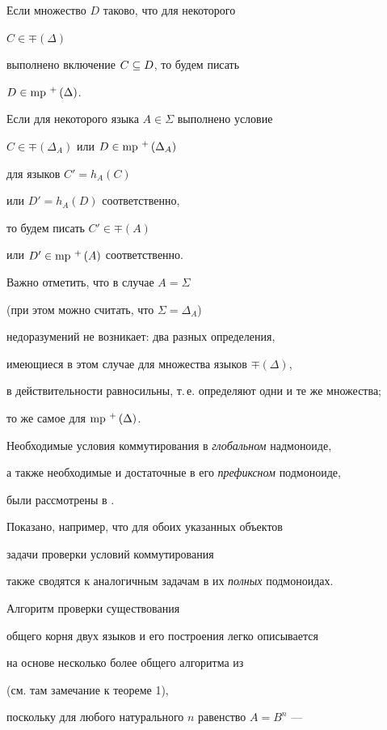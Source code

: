 \setcounter{footnote}{0}





 Если множество $D$ таково, что для некоторого


$C\in\mp(\Delta) $


 выполнено включение $C\subseteq D$, то будем писать


$D\in\operatorname{mp}\,^+\,(\Delta) $.


 Если для некоторого языка $A\in\Sigma$ выполнено условие


$C\in\mp(\Delta_A)$ или $D\in\operatorname{mp}\,^+\,(\Delta_A)$


для языков $C'=h_A(C)$


или  $D'=h_A(D)$ соответственно,


то будем писать $C'\in\mp(A)$


или  $D'\in\operatorname{mp}\,^+\,(A)$ соответственно.


 Важно отметить, что в случае $A=\Sigma$


 (при этом можно считать, что $\Sigma=\Delta_A$)


 недоразумений не возникает: два разных определения,


 имеющиеся в этом случае для множества языков $\mp(\Delta)$,


 в действительности равносильны, т.\,е. определяют одни и те же множества;


 то же самое для $\operatorname{mp}\,^+\,(\Delta)$.





 Необходимые условия коммутирования в {\it глобальном\/} надмоноиде,


 а также необходимые и достаточные в его {\it префиксном\/} подмоноиде,


 были рассмотрены в \cite{io13}.


 Показано, например, что для обоих указанных объектов


 задачи проверки условий коммутирования


 также сводятся к аналогичным задачам в их {\it полных\/} подмоноидах.


 Алгоритм проверки существования


 общего корня двух языков и его построения легко описывается


 на основе несколько более общего алгоритма из


\cite{io7}


 (см. там замечание к теореме 1),


 поскольку для любого натурального $n$ равенство $A=B^n$ ---


